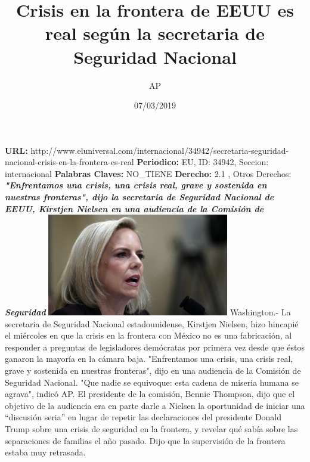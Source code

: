 \documentclass{article}%
\title{\textbf{Crisis en la frontera de EEUU es real según la secretaria de Seguridad Nacional}}%
\author{AP}%
\date{07/03/2019}%
\begin{document}
%
\normalsize%
\maketitle%
\textbf{URL: }%
http://www.eluniversal.com/internacional/34942/secretaria{-}seguridad{-}nacional{-}crisis{-}en{-}la{-}frontera{-}es{-}real\newline%
%
\textbf{Periodico: }%
EU, %
ID: %
34942, %
Seccion: %
internacional\newline%
%
\textbf{Palabras Claves: }%
NO\_TIENE\newline%
%
\textbf{Derecho: }%
2.1%
, Otros Derechos: %
\newline%
%
\textbf{\textit{"Enfrentamos una crisis, una crisis real, grave y sostenida en nuestras fronteras", dijo la secretaria de Seguridad Nacional de EEUU, Kirstjen Nielsen en una audiencia de la Comisión de Seguridad}}%
\newline%
\newline%
%
\includegraphics[width=300px]{EU_34942.jpg}%
\newline%
%
Washington.{-} La secretaria de Seguridad Nacional estadounidense, Kirstjen Nielsen, hizo hincapié el miércoles en que la crisis en la frontera con México no es una fabricación, al responder a preguntas de legisladores demócratas por primera vez desde que éstos ganaron la mayoría en la cámara baja.%
\newline%
%
"Enfrentamos una crisis, una crisis real, grave y sostenida en nuestras fronteras", dijo en una audiencia de la Comisión de Seguridad Nacional. "Que nadie se equivoque: esta cadena de miseria humana se agrava", indicó AP.%
\newline%
%
El presidente de la comisión, Bennie Thompson, dijo que el objetivo de la audiencia era en parte darle a Nielsen la oportunidad de iniciar una “discusión seria” en lugar de repetir las declaraciones del presidente Donald Trump sobre una crisis de seguridad en la frontera, y revelar qué sabía sobre las separaciones de familias el año pasado. Dijo que la supervisión de la frontera estaba muy retrasada.%
\newline%
\end{document}
